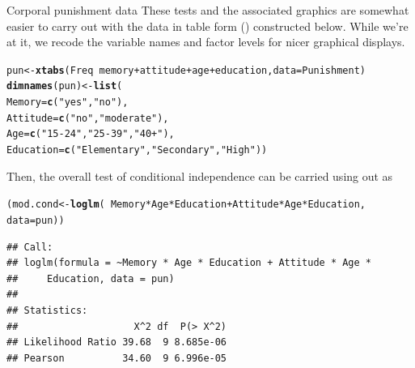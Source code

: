 \documentclass[11pt]{book}\usepackage[]{graphicx}\usepackage[]{color}
\makeatletter
\newcommand{\hlstr}[1]{\textcolor[rgb]{0.192,0.494,0.8}{#1}}%
\newcommand{\hlopt}[1]{\textcolor[rgb]{0,0,0}{#1}}%
\newcommand{\hlstd}[1]{\textcolor[rgb]{0.345,0.345,0.345}{#1}}%
\newcommand{\hlkwb}[1]{\textcolor[rgb]{0.69,0.353,0.396}{#1}}%
\newcommand{\hlkwc}[1]{\textcolor[rgb]{0.333,0.667,0.333}{#1}}%
\newcommand{\hlkwd}[1]{\textcolor[rgb]{0.737,0.353,0.396}{\textbf{#1}}}%
\newenvironment{kframe}{%
 \def\at@end@of@kframe{}%
 \ifinner\ifhmode%
  \def\at@end@of@kframe{\end{minipage}}%
  \begin{minipage}{\columnwidth}%
 \fi\fi%
 \def\FrameCommand##1{\hskip\@totalleftmargin \hskip-\fboxsep
 \colorbox{shadecolor}{##1}\hskip-\fboxsep
     \hskip-\linewidth \hskip-\@totalleftmargin \hskip\columnwidth}%
 \MakeFramed {\advance\hsize-\width
   \@totalleftmargin\z@ \linewidth\hsize
   \@setminipage}}%
 {\par\unskip\endMakeFramed%
 \at@end@of@kframe}
\newenvironment{knitrout}{}{} %
\renewenvironment{knitrout}{\small\renewcommand{\baselinestretch}{.85}}{} %
\makeatother
\begin{document}
\begin{Example}[punish]{Corporal punishment data}
These tests and the associated graphics are somewhat easier to carry out with the data
in table form () constructed below.  While we're at it, we recode the 
variable names and factor levels for nicer graphical displays.
\begin{knitrout}
\color{fgcolor}\begin{kframe}
\begin{alltt}
\hlstd{pun} \hlkwb{<-} \hlkwd{xtabs}\hlstd{(Freq} \hlopt{~} \hlstd{memory} \hlopt{+} \hlstd{attitude} \hlopt{+} \hlstd{age} \hlopt{+} \hlstd{education,} \hlkwc{data} \hlstd{= Punishment)}
\hlkwd{dimnames}\hlstd{(pun)} \hlkwb{<-} \hlkwd{list}\hlstd{(}
  \hlkwc{Memory} \hlstd{=} \hlkwd{c}\hlstd{(}\hlstr{"yes"}\hlstd{,} \hlstr{"no"}\hlstd{),}
  \hlkwc{Attitude} \hlstd{=} \hlkwd{c}\hlstd{(}\hlstr{"no"}\hlstd{,} \hlstr{"moderate"}\hlstd{),}
  \hlkwc{Age} \hlstd{=} \hlkwd{c}\hlstd{(}\hlstr{"15-24"}\hlstd{,} \hlstr{"25-39"}\hlstd{,} \hlstr{"40+"}\hlstd{),}
  \hlkwc{Education} \hlstd{=} \hlkwd{c}\hlstd{(}\hlstr{"Elementary"}\hlstd{,} \hlstr{"Secondary"}\hlstd{,} \hlstr{"High"}\hlstd{))}
\end{alltt}
\end{kframe}
\end{knitrout}


Then, the overall test of conditional independence can be carried using  out as
\begin{knitrout}
\color{fgcolor}\begin{kframe}
\begin{alltt}
\hlstd{(mod.cond} \hlkwb{<-} \hlkwd{loglm}\hlstd{(}\hlopt{~} \hlstd{Memory}\hlopt{*}\hlstd{Age}\hlopt{*}\hlstd{Education} \hlopt{+} \hlstd{Attitude}\hlopt{*}\hlstd{Age}\hlopt{*}\hlstd{Education,}
                   \hlkwc{data} \hlstd{= pun))}
\end{alltt}
\begin{verbatim}
## Call:
## loglm(formula = ~Memory * Age * Education + Attitude * Age * 
##     Education, data = pun)
## 
## Statistics:
##                    X^2 df  P(> X^2)
## Likelihood Ratio 39.68  9 8.685e-06
## Pearson          34.60  9 6.996e-05
\end{verbatim}
\end{kframe}
\end{knitrout}


\end{Example}
\end{document}
